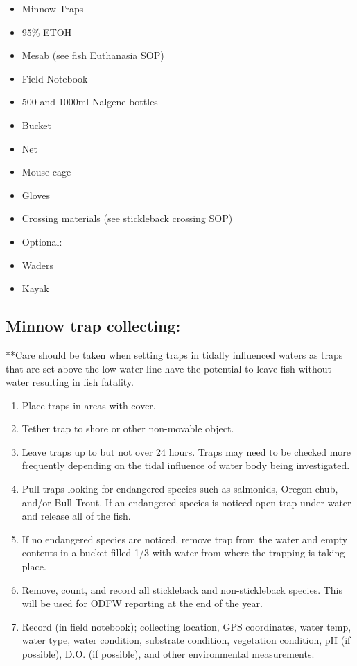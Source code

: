 \documentclass[
]{book}
\providecommand{\tightlist}{%
  \setlength{\itemsep}{0pt}\setlength{\parskip}{0pt}}
\begin{document}
\begin{itemize}
\tightlist
\item
  Minnow Traps
\item
  95\% ETOH
\item
  Mesab (see fish Euthanasia SOP)
\item
  Field Notebook
\item
  500 and 1000ml Nalgene bottles
\item
  Bucket
\item
  Net
\item
  Mouse cage
\item
  Gloves
\item
  Crossing materials (see stickleback crossing SOP)
\item
  Optional:
\item
  Waders
\item
  Kayak
\end{itemize}

\hypertarget{minnow-trap-collecting}{%
\subsection{Minnow trap collecting:}\label{minnow-trap-collecting}}

**Care should be taken when setting traps in tidally influenced waters as traps that are set above the low water line have the potential to leave fish without water resulting in fish fatality.

\begin{enumerate}
\def\labelenumi{\arabic{enumi}.}
\tightlist
\item
  Place traps in areas with cover.
\item
  Tether trap to shore or other non-movable object.
\item
  Leave traps up to but not over 24 hours. Traps may need to be checked more frequently depending on the tidal influence of water body being investigated.
\item
  Pull traps looking for endangered species such as salmonids, Oregon chub, and/or Bull Trout. If an endangered species is noticed open trap under water and release all of the fish.
\item
  If no endangered species are noticed, remove trap from the water and empty contents in a bucket filled 1/3 with water from where the trapping is taking place.
\item
  Remove, count, and record all stickleback and non-stickleback species. This will be used for ODFW reporting at the end of the year.
\item
  Record (in field notebook); collecting location, GPS coordinates, water temp, water type, water condition, substrate condition, vegetation condition, pH (if possible), D.O. (if possible), and other environmental measurements.
\end{enumerate}
\end{document}
